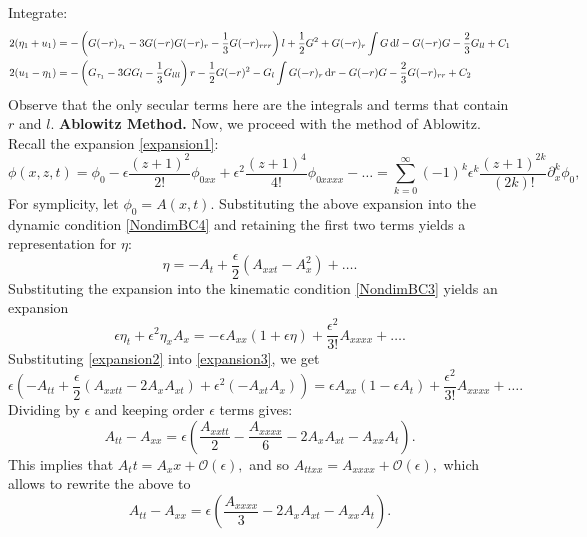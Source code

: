 \documentclass[10pt,reqno,oneside,a4paper]{article}
\begin{document}
Integrate:
\begin{align*}
2(\eta_{1} + u_{1}) &= -\left(G(-r)_{\tau_1} - 3G(-r)G(-r)_r - \frac{1}{3} G(-r)_{rrr}\right)l + \frac{1}{2}G^2  + G(-r)_r \int G \,\mathrm{d} l - G(-r)G - \frac{2}{3} G_{ll} + C_1 \\
2(u_{1} - \eta_{1}) &=  - \left(G_{\tau_1} - 3GG_l - \frac{1}{3}G_{lll}\right)r -  \frac{1}{2}G(-r)^2 - G_l \int G(-r)_r \,\mathrm{d} r - G(-r)G   - \frac{2}{3}G(-r)_{rr} +C_2 
\end{align*}
Observe that the only secular terms here are the integrals and terms that contain $r$ and $l.$
\vspace{1cm}
\newline \textbf{Ablowitz Method.} Now, we proceed with the method of Ablowitz. Recall the expansion \eqref{expansion1}:
\[
\phi(x,z,t) = \phi_0 - \epsilon\frac{(z+1)^2}{2!}\phi_{0xx} + \epsilon^2 \frac{(z+1)^4}{4!}\phi_{0xxxx} - \ldots = \sum^{\infty}_{k=0} (-1)^k \epsilon^k \frac{(z+1)^{2k}}{(2k)!} \partial^k_x \phi_0,
\]
For symplicity, let $\phi_0 = A(x,t).$ Substituting the above expansion into the dynamic condition \eqref{NondimBC4} and retaining the first two terms yields a representation for $\eta:$
\begin{equation}\label{expansion2}
\eta = -A_t + \frac{\epsilon}{2}(A_{xxt} - A_x^2) + \ldots .
\end{equation}
Substituting the expansion into the kinematic condition \eqref{NondimBC3} yields an expansion
\begin{equation}\label{expansion3}
\epsilon \eta_t + \epsilon^2 \eta_x A_x = -\epsilon A_{xx}(1+ \epsilon \eta) + \frac{\epsilon^2}{3!}A_{xxxx} + \ldots .
\end{equation}
Substituting \eqref{expansion2} into \eqref{expansion3}, we get 
\begin{equation}\label{well-posed}
\epsilon(-A_{tt} + \frac{\epsilon}{2}(A_{xxtt} - 2A_xA_{xt})+\epsilon^2(-A_{xt}A_x)) = \epsilon A_{xx}(1- \epsilon A_t) + \frac{\epsilon^2}{3!}A_{xxxx} + \ldots.
\end{equation}
Dividing by $\epsilon$ and keeping order $\epsilon$ terms gives:
\[ 
A_{tt} - A_{xx} = \epsilon\left(\frac{A_{xxtt}}{2} - \frac{A_{xxxx}}{6} - 2A_xA_{xt} - A_{xx}A_{t}\right).
\]
This implies that $A_tt = A_xx + \mathcal{O}(\epsilon),$ and so $A_{ttxx} = A_{xxxx} + \mathcal{O}(\epsilon),$ which allows to rewrite the above to
\begin{equation}\label{ill-posed}
A_{tt} - A_{xx} = \epsilon\left(\frac{A_{xxxx}}{3} - 2A_xA_{xt} - A_{xx}A_{t}\right).
\end{equation}
\end{document}
